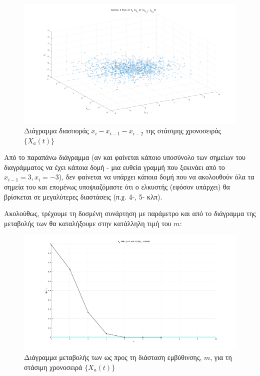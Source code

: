 \begin{figure}[H]
    \begin{center}
        \includegraphics[width=\textwidth]{assets/images/plots/scatter3_a.svg.pdf}
        \caption{Διάγραμμα διασποράς $x_i-x_{i-1}-x_{i-2}$ της στάσιμης χρονοσειράς $\{X_a(t)\}$}
        \label{fig:scatter3_a}
    \end{center}
\end{figure}

Από το παραπάνω διάγραμμα (αν και φαίνεται κάποιο υποσύνολο των σημείων του διαγράμματος να έχει κάποια δομή - μια ευθεία γραμμή που ξεκινάει από το $x_{i-1}=3, x_{i}=-3$), δεν φαίνεται να υπάρχει κάποια δομή που να ακολουθούν όλα τα σημεία του  και επομένως υποψιαζόμαστε ότι ο ελκυστής (εφόσον υπάρχει) θα βρίσκεται σε μεγαλύτερες διαστάσεις (π.χ. 4-, 5- κλπ).

\par Ακολούθως, τρέχουμε τη δοσμένη συνάρτηση \texttt{} με παράμετρο \texttt{} και από το διάγραμμα της μεταβολής των  θα καταλήξουμε στην κατάλληλη τιμή του $m$:

\begin{figure}[H]
    \begin{center}
        \includegraphics[width=\textwidth]{assets/images/plots/fnn_a.svg.pdf}
        \caption{Διάγραμμα μεταβολής των  ως προς τη διάσταση εμβύθινσης, $m$, για τη στάσιμη χρονοσειρά $\{X_a(t)\}$}
        \label{fig:fnn_a}
    \end{center}
\end{figure}

